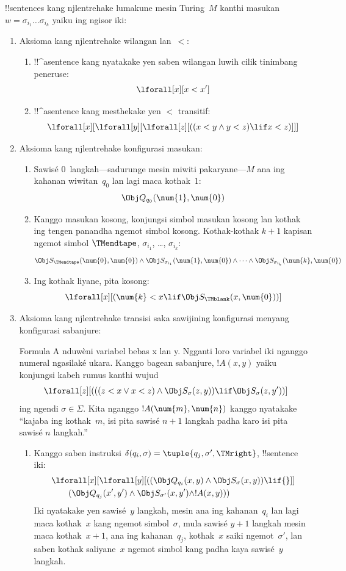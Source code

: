 \documentclass[../../../include/open-logic-section]{subfiles}
\begin{document}
!!{sentence}s kang njlentrehake lumakune mesin Turing~$M$
kanthi masukan $w = \sigma_{i_1}\dots\sigma_{i_k}$
yaiku ing ngisor iki:
\begin{enumerate}
\item Aksioma kang njlentrehake wilangan lan~$<$:
\begin{enumerate}
\item !!^a{sentence} kang nyatakake yen saben wilangan
luwih cilik tinimbang peneruse:
\[
\lforall[x][x < x']
\]
\item !!^a{sentence} kang mesthekake yen $<$ transitif:
\[
\lforall[x][\lforall[y][\lforall[z][
      ((x < y \land y < z) \lif x < z)]]]
\]
\end{enumerate}
\item Aksioma kang njlentrehake konfigurasi masukan:
\begin{enumerate}
\item Sawisé $0$~langkah---sadurunge mesin miwiti
  pakaryane---$M$ ana ing kahanan wiwitan~$q_0$
  lan lagi maca kothak~$1$:
\[
\Obj Q_{q_0}(\num{1}, \num{0})
\]
\item Kanggo masukan kosong, konjungsi simbol masukan kosong lan kothak ing tengen panandha ngemot simbol kosong. Kothak-kothak $k+1$ kapisan ngemot simbol
  $\TMendtape$, $\sigma_{i_1}$, \dots, $\sigma_{i_k}$:
\[
\Obj S_\TMendtape(\num{0}, \num{0}) \land
\Obj S_{\sigma_{i_1}}(\num{1}, \num{0}) \land
\dots \land
\Obj S_{\sigma_{i_k}}(\num{k}, \num{0})
\]
\item Ing kothak liyane, pita kosong:
\[
\lforall[x][(\num{k} < x \lif \Obj S_\TMblank(x, \num{0}))]
\]
\end{enumerate}
\item Aksioma kang njlentrehake transisi saka
  sawijining konfigurasi menyang konfigurasi sabanjure:

Formula A nduwèni variabel bebas x lan y. Ngganti loro variabel iki nganggo numeral ngasilaké ukara.
Kanggo bagean sabanjure, $!A(x, y)$ yaiku
konjungsi kabeh rumus kanthi wujud
\[
\lforall[z][
  (((z < x \lor x < z) \land \Obj S_\sigma(z, y))
  \lif \Obj S_\sigma(z, y'))]
\]
ing ngendi $\sigma \in \Sigma$.
Kita nganggo $!A(\num{m},\num{n})$ kanggo
nyatakake ``kajaba ing kothak~$m$, isi pita
sawisé $n+1$ langkah padha karo isi pita
sawisé $n$ langkah.''
\begin{enumerate}
\item {} Kanggo saben instruksi $\delta(q_i, \sigma) =
  \tuple{q_j, \sigma', \TMright}$, !!{sentence} iki:
\begin{align*}
& \lforall[x][\lforall[y][(
   (\Obj Q_{q_i}(x, y) \land \Obj S_{\sigma}(x, y)) \lif {}]] \\
&\qquad   (\Obj Q_{q_j}(x', y') \land \Obj S_{\sigma'}(x, y') \land
!A(x, y)))
\end{align*}
Iki nyatakake yen sawisé~$y$ langkah, mesin ana
ing kahanan~$q_i$ lan lagi maca kothak~$x$
kang ngemot simbol~$\sigma$, mula sawisé
$y+1$ langkah mesin maca kothak~$x+1$,
ana ing kahanan~$q_j$, kothak~$x$ saiki
ngemot~$\sigma'$, lan saben kothak saliyane~$x$
ngemot simbol kang padha kaya sawisé~$y$ langkah.


\end{enumerate}
\end{enumerate}
\end{document}
